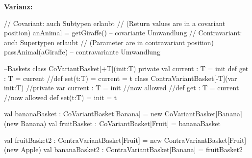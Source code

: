 \begin{breakbox}
\textbf{Varianz:}\\
\begin{scalacode}
// Covariant: auch Subtypen erlaubt 
// (Return values are in a covariant position)
anAnimal = getGiraffe() -- covariante Umwandlung
// Contravariant: auch Supertypen erlaubt 
// (Parameter are in contravariant position)
passAnimal(aGiraffe) -- contravariante Umwandlung

--Baskets
class CoVariantBasket[+T](init:T) {
  private val current : T = init
  def get : T = current
  //def set(t:T) = current = t
}
class ContraVariantBasket[-T](var init:T) {
  //private var current : T = init //now allowed
  //def get : T = current //now allowed
  def set(t:T) = init = t
}

val bananaBasket : CoVariantBasket[Banana] = 
	new CoVariantBasket[Banana](new Banana)
val fruitBasket : CoVariantBasket[Fruit] = bananaBasket

val fruitBasket2 : ContraVariantBasket[Fruit] = 
	new ContraVariantBasket[Fruit](new Apple)
val bananaBasket2 : ContraVariantBasket[Banana] = fruitBasket2
\end{scalacode}
\end{breakbox}


